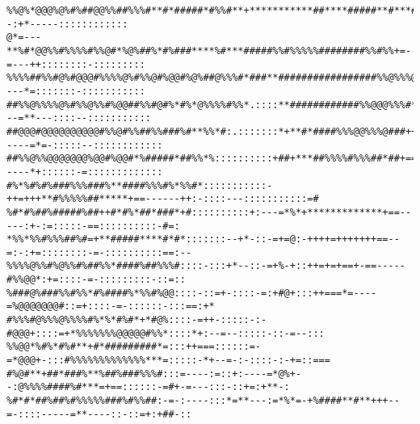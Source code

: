 \documentclass[12pt]{article}
\begin{document}
\begin{verbatim}
%%@%*@@@%@%#%##@@%%##%%%#**#*#####*#%%#**+***********##****#####**#***##*#%===--:+*-----::::::::::::
@*=---**%#*@@%%#%%%%#%%@#*%@%##%*#%###****%#***#####%%#%%%%%########%%#%%+=-=---++::::::::-:::::::::
%%%%##%%#@%#@@@#%%%%@%#%%@#%@@#%@%##@%%%#*###**#################%%@%%%@#+==----*=:::::::-:::::::::::
##%%@%%%%@%#%%@%%#%@@##%%#@#%*#%*@%%%%#%%*.::::**############%%@@@%%%#*+==---=**---::::--:::::::::::
##@@@#@@@@@@@@@@#%%@#%%##%%###%#**%%*#:.:::::::*+**#*####%%%@@%%%@###++=-----=*=-:::::--::::::::::::
##%%@%%@@@@@@@%@@#%@@#*%#####*##%%*%::::::::::+##+***##%%%%#%%%##*##+===-----*+::::::-=:::::::::::::
#%*%#%#%###%%%###%**####%%%#%*%%#*:::::::::::-++=+++**#%%%%%##*****+==------++:-::::---:::::::::::=#
%#*#%##%#####%##++#*#%*##*###*+#::::::::::+:---=*%*+*************+==-----:+-:=:::::-==::::::::::-#=:
*%%*%%#%%%##%#=+**#####****#*#*:::::::--+*-::-=+=@:-++++=+++++++==--=:-:+=::::::::-=-::::::::::==:--
%%%%@%%#%@%%#%##%%*####%##%%%#::::-:::+*--::-=+%-+::++=+=+==+-==-----#%%@@*:+=::::-=-:::::::::-::=::
%###@%###%%#%%*#%####%*%%#%@@::::-::=+-::::-=:+#@+:::++===*=----=%@@@@@@@#::=+::::-=-::::::-:::==:+*
#%%%#@%%%@%%%%#%*%*#%#*+*#@%::::-=++-:::::-:-#@@@+::::=+*%%%%%%%@@@@@#%%*::::*+:--=--:::::-::-=--:::
%%@@*%#%*#%#**+#*#########*=:::++===::::::=-=*@@@+-:::#%%%%%%%%%%%%%***=:::::-*+--=-:-::::-:-+=::===
#%@#**+##*###%**%##%###%%%#:::=----:=::+:----=*@%+--:@%%%%####%#***=+==::::::-=#+-=---:::-::+=:+**-:
%#*#*##%##%#%%%%%###%#%%##:-=-:----:::*=**---:=*%*=-+%####**#**+++--=-::::-----=**----::-::=+:+##-::
\end{verbatim}
\end{document}
